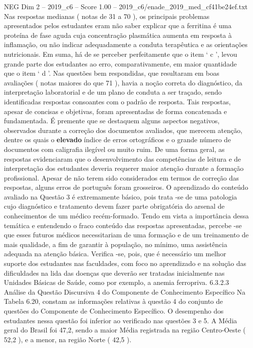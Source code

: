 \begin{textsample}{NEG Dim 2 – 2019\_c6 – Score 1.00 – 2019\_c6/enade\_2019\_med\_cf41be24ef.txt}
Nas respostas medianas ( notas de 31 a 70 ), os principais problemas apresentados pelos estudantes eram não saber explicar que a ferritina é uma proteína de fase aguda cuja concentração plasmática aumenta em resposta à inflamação, ou não indicar adequadamente a conduta terapêutica e as orientações nutricionais.
Em suma, há de se perceber perfeitamente que o item ‘ c ’, levou grande parte dos estudantes ao erro, comparativamente, em maior quantidade que o item ‘ d ’.
Nas questões bem respondidas, que resultaram em boas avaliações ( notas maiores do que 71 ), havia a noção correta do diagnóstico, da interpretação laboratorial e de um plano de conduta a ser traçado, sendo identificadas respostas consoantes com o padrão de resposta.
Tais respostas, apesar de concisas e objetivas, foram apresentadas de forma concatenada e fundamentada.
É premente que se destaquem alguns aspectos negativos, observados durante a correção dos documentos avaliados, que merecem atenção, dentre os quais o \textbf{elevado} índice de erros ortográficos e o grande número de documentos com caligrafia ilegível ou muito ruim.
De uma forma geral, as respostas evidenciaram que o desenvolvimento das competências de leitura e de interpretação dos estudantes deveria requerer maior atenção durante a formação profissional.
Apesar de não terem sido considerados em termos de correção das respostas, alguns erros de português foram grosseiros.
O aprendizado do conteúdo avaliado na Questão 3 é extremamente básico, pois trata -se de uma patologia cujo diagnóstico e tratamento devem fazer parte obrigatória do arsenal de conhecimentos de um médico recém-formado.
Tendo em vista a importância dessa temática e entendendo o fraco conteúdo das respostas apresentadas, percebe -se que esses futuros médicos necessitariam de uma formação e de um treinamento de mais qualidade, a fim de garantir à população, no mínimo, uma assistência adequada na atenção básica.
Verifica -se, pois, que é necessário um melhor suporte dos estudantes nas faculdades, com foco no aprendizado e na solução das dificuldades na lida das doenças que deverão ser tratadas inicialmente nas Unidades Básicas de Saúde, como por exemplo, a anemia ferropriva. 6.3.2.3 Análise da Questão Discursiva 4 do Componente de Conhecimento Específico Na Tabela 6.20, constam as informações relativas à questão 4 do conjunto de questões do Componente de Conhecimento Específico.
O desempenho dos estudantes nessa questão foi inferior ao verificado nas questões 3 e 5.
A Média geral do Brasil foi 47,2, sendo a maior Média registrada na região Centro-Oeste ( 52,2 ), e a menor, na região Norte ( 42,5 ).

\end{textsample}
